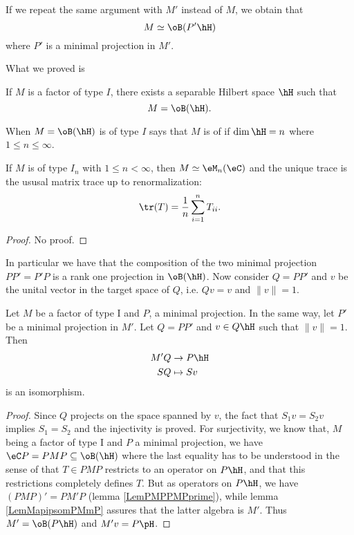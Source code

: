 If we repeat the same argument with $M'$ instead of $M$, we obtain that 
\begin{equation}		\label{EqMPHtypeIBh}
		M\simeq\oB(P'\hH)
\end{equation}
where $P'$ is a minimal projection in $M'$.

What we proved is
\begin{proposition}
If $M$ is a factor of type $I$, there exists a separable Hilbert space $\hH$ such that
\begin{equation}
	M=\oB(\hH).
\end{equation}
\end{proposition}

When $M=\oB(\hH)$ is of type $I$ says that $M$ is of  if $\dim\hH=n$ where $1\leq n \leq\infty$.

\begin{proposition}
If $M$ is of type $I_n$ with $1\leq n <\infty$, then $M\simeq \eM_n(\eC)$ and the unique trace is the ususal matrix trace up to renormalization:
\begin{equation}
	\tr(T)=\frac{1}{ n }\sum_{i=1}^nT_{ii}.
\end{equation}
\end{proposition}
\begin{proof}
No proof.
\end{proof}



In particular we have that the composition of the two minimal projection $PP'=P'P$ is a rank one projection in $\oB(\hH)$. Now consider $Q=PP'$ and $v$ be the unital vector in the target space of $Q$, i.e. $Qv=v$ and $\| v \|=1$.

\begin{proposition}
Let $M$ be a factor of type I and $P$, a minimal projection. In the same way, let $P'$ be a minimal projection in $M'$. Let $Q=PP'$ and $v\in Q\hH$ such that $\| v \|=1$. Then
\begin{equation}
\begin{aligned}
 M'Q&\to P\hH \\ 
   SQ&\mapsto Sv 
\end{aligned}
\end{equation}
is an isomorphism.
\end{proposition}

\begin{proof}
Since $Q$ projects on the space spanned by $v$, the fact that $S_1v=S_2v$ implies $S_1=S_2$ and the injectivity is proved. For surjectivity, we know that, $M$ being a factor of type I and $P$ a minimal projection, we have $\eC P=PMP\subseteq\oB(\hH)$ where the last equality has to be understood in the sense of that $T\in PMP$ restricts to an operator on $P\hH$, and that this restrictions completely defines $T$. But as operators on $P\hH$, we have $(PMP)'=PM'P$ (lemma \ref{LemPMPPMPprime}), while lemma \ref{LemMapipsomPMmP} assures that the latter algebra is $M'$. Thus $M'=\oB(P\hH)$ and $M'v=P\pH$.
\end{proof}

